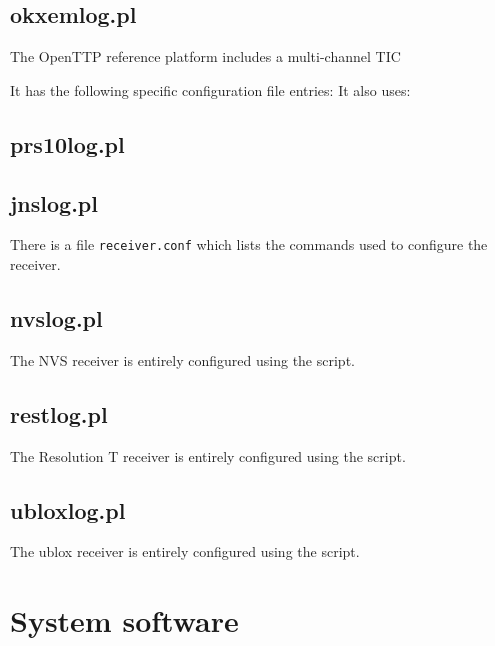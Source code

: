 \documentclass[11pt,a4paper,openany,oneside]{book}
\newcommand{\cc}[1]{{\texttt{#1}}}
\begin{document}








\section{okxemlog.pl}
\hypertarget{h:okxemlog}{}
The OpenTTP reference platform includes a multi-channel TIC

It has the following specific configuration file entries:
It also uses:

\section{prs10log.pl}
\hypertarget{h:prs10log}{}

\section{jnslog.pl}
\hypertarget{h:jnslog}{}
There is a file \cc{receiver.conf} which lists the commands used to configure the receiver.

\section{nvslog.pl}
\hypertarget{h:nvslog}{}

The NVS receiver is entirely configured using the script.

\section{restlog.pl}
\hypertarget{h:restlog}{}

The Resolution T receiver is entirely configured using the script.

\section{ubloxlog.pl}
\hypertarget{h:ubloxlog}{}

The ublox receiver is entirely configured using the script.



\chapter{System software}
\end{document}
